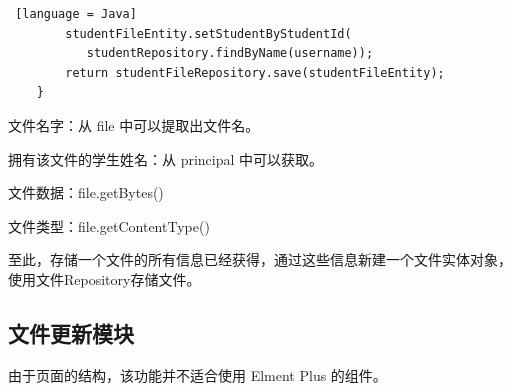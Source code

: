 \begin{enumerate}
\begin{enumerate}
\begin{lstlisting} [language = Java]
        studentFileEntity.setStudentByStudentId(
           studentRepository.findByName(username));
        return studentFileRepository.save(studentFileEntity);
    }
        \end{lstlisting}
                文件名字：从 file 中可以提取出文件名。

                拥有该文件的学生姓名：从 principal 中可以获取。

                文件数据：file.getBytes()

                文件类型：file.getContentType()

                至此，存储一个文件的所有信息已经获得，通过这些信息新建一个文件实体对象，使用文件Repository存储文件。
        \end{enumerate}
\end{enumerate}

\subsection{文件更新模块}

由于页面的结构，该功能并不适合使用 Elment Plus 的组件。

